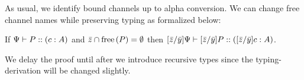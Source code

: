 As usual, we identify bound channels up to alpha conversion. We can change free channel names while preserving typing as formalized below:
\begin{lemma}
  \label{channel-substitution-pre}
  If $\Psi \vdash P :: (c : A)$ and $\bar{z} \cap \operatorname{free} {(P)} = \emptyset$ then $\lbrack{\bar{z}}/{\bar{y}}\rbrack{\Psi} \vdash \lbrack{\bar{z}}/{\bar{y}}\rbrack{P} :: (\lbrack{\bar{z}}/{\bar{y}}\rbrack{c} : A)$.
\end{lemma}

We delay the proof until after we introduce recursive types since the typing-derivation will be changed slightly.


